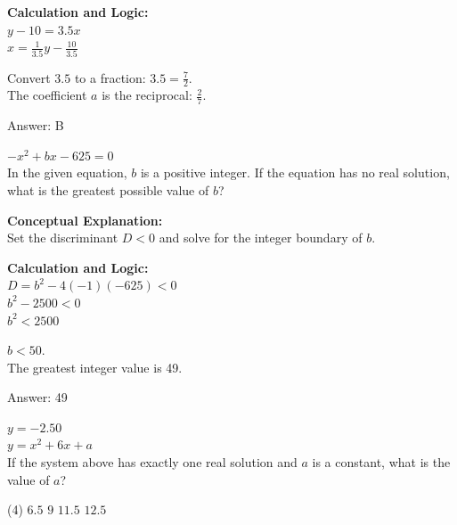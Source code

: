 \documentclass[11pt,paper=a4,answers]{exam}
\begin{document}
\begin{questions}
\begin{solution}
\vspace{20pt}

\textbf{Calculation and Logic:} \\
$y - 10 = 3.5x$ \\
$x = \frac{1}{3.5}y - \frac{10}{3.5}$

\vspace{10pt}

Convert $3.5$ to a fraction: $3.5 = \frac{7}{2}$. \\
The coefficient $a$ is the reciprocal: $\frac{2}{7}$.

\vspace{25pt}

Answer: \colorbox{yellow!100}{B}
\end{solution}

\vspace{40pt}

\question
$-x^2 + bx - 625 = 0$ \\
In the given equation, $b$ is a positive integer. If the equation has no real solution, what is the greatest possible value of $b$?

\begin{solution}
\textbf{Conceptual Explanation:} \\
Set the discriminant $D < 0$ and solve for the integer boundary of $b$.

\vspace{20pt}

\textbf{Calculation and Logic:} \\
$D = b^2 - 4(-1)(-625) < 0$ \\
$b^2 - 2500 < 0$ \\
$b^2 < 2500$

\vspace{10pt}

$b < 50$. \\
The greatest integer value is 49.

\vspace{25pt}

Answer: \colorbox{yellow!100}{49}
\end{solution}

\vspace{40pt}

\question
$y = -2.50$ \\
$y = x^2 + 6x + a$ \\
If the system above has exactly one real solution and $a$ is a constant, what is the value of $a$?
\begin{tasks}(4)
    \task $6.5$
    \task $9$
    \task $11.5$
    \task $12.5$
\end{tasks}


\end{questions}
\end{document}
